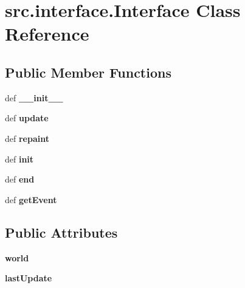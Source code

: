 \hypertarget{classsrc_1_1interface_1_1_interface}{\section{src.\-interface.\-Interface \-Class \-Reference}
\label{classsrc_1_1interface_1_1_interface}
}
\subsection*{\-Public \-Member \-Functions}
\begin{DoxyCompactItemize}
\item 
\hypertarget{classsrc_1_1interface_1_1_interface_ada1c3a225225626675df15f61d113559}{def {\bfseries \-\_\-\-\_\-init\-\_\-\-\_\-}}\label{classsrc_1_1interface_1_1_interface_ada1c3a225225626675df15f61d113559}

\item 
\hypertarget{classsrc_1_1interface_1_1_interface_a56fcf21535627c98870d5ca933fe7ddb}{def {\bfseries update}}\label{classsrc_1_1interface_1_1_interface_a56fcf21535627c98870d5ca933fe7ddb}

\item 
\hypertarget{classsrc_1_1interface_1_1_interface_aadda30cb84c120e7ba0c781d18859f7c}{def {\bfseries repaint}}\label{classsrc_1_1interface_1_1_interface_aadda30cb84c120e7ba0c781d18859f7c}

\item 
\hypertarget{classsrc_1_1interface_1_1_interface_a175b33c763cf6654d9805efa35b94957}{def {\bfseries init}}\label{classsrc_1_1interface_1_1_interface_a175b33c763cf6654d9805efa35b94957}

\item 
\hypertarget{classsrc_1_1interface_1_1_interface_affdfa9bd62cfe35c63cbc070136ef103}{def {\bfseries end}}\label{classsrc_1_1interface_1_1_interface_affdfa9bd62cfe35c63cbc070136ef103}

\item 
\hypertarget{classsrc_1_1interface_1_1_interface_ab15aafe11ab68ed033fc2c11713a99bf}{def {\bfseries get\-Event}}\label{classsrc_1_1interface_1_1_interface_ab15aafe11ab68ed033fc2c11713a99bf}

\end{DoxyCompactItemize}
\subsection*{\-Public \-Attributes}
\begin{DoxyCompactItemize}
\item 
\hypertarget{classsrc_1_1interface_1_1_interface_ad653ebd1abc974f923316aa1be5b4da0}{{\bfseries world}}\label{classsrc_1_1interface_1_1_interface_ad653ebd1abc974f923316aa1be5b4da0}

\item 
\hypertarget{classsrc_1_1interface_1_1_interface_ac520185c5c891a4a5caefa018153f040}{{\bfseries last\-Update}}\label{classsrc_1_1interface_1_1_interface_ac520185c5c891a4a5caefa018153f040}

\end{DoxyCompactItemize}


